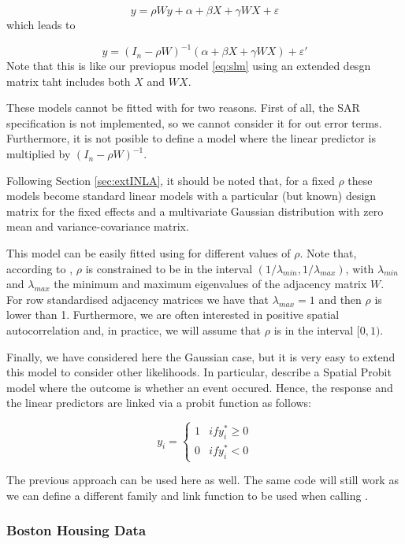 \documentclass[article]{jss}
\begin{document}
$$
y= \rho W y+ \alpha+\beta X+\gamma W X +\varepsilon 
$$
\noindent
which leads to

$$
y= (I_n-\rho W)^{-1}(\alpha+\beta X+\gamma W X) +\varepsilon '
$$
\noindent
Note that this is like our previopus model \ref{eq:slm} using an extended desgn
matrix taht includes both $X$ and $W X$.

These models cannot be fitted with  for two reasons. First of all, 
the SAR specification is not implemented, so we cannot consider it for out
error terms. Furthermore, it is not posible to define a model 
where the linear predictor is multiplied by $(I_n-\rho W)^{-1}$.

Following Section \ref{sec:extINLA}, it should be noted that, for a fixed
$\rho$ these models become standard linear models with a particular 
(but known) design matrix for the fixed effects and a multivariate Gaussian
distribution with zero mean and variance-covariance matrix.

This model can be easily fitted using  for different values
of $\rho$. Note that, according to \citet{Haining:2003}, $\rho$ is constrained 
to be in the interval $(1/\lambda_{min}, 1/\lambda_{max})$, with
$\lambda_{min}$ and $\lambda_{max}$ the minimum and maximum eigenvalues of
the adjacency matrix $W$. For row standardised adjacency matrices we have that
$\lambda_{max}=1$ and then $\rho$ is lower than 1. Furthermore, we are often
interested in positive spatial autocorrelation and, in practice, we will
assume that $\rho$ is in the interval $[0,1)$.


Finally, we have considered here the Gaussian case, but it is very easy to
extend this model to consider other likelihoods. In particular,
\citet{LeSageetal:2011} describe a Spatial Probit model where the outcome is
whether an event occured. Hence, the response and the linear predictors are
linked via a probit function as follows:

$$
y_i=
\left\{
\begin{array}{cc}
1 & if y^*_i\geq 0\\
0 & if y^*_i < 0
\end{array}
\right.
$$

The previous approach can be used here as well. The same code will still work
as we can define a different family and link function to be used when calling
.

\subsubsection{Boston Housing Data}
\end{document}
